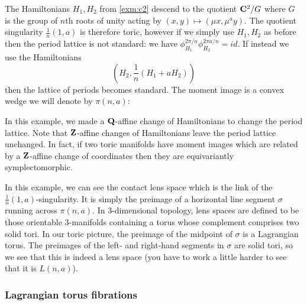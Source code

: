 \documentclass{article}
\begin{document}
\begin{Example}\label{exm:quotsing}
The Hamiltonians \(H_1,H_2\) from \cref{exm:c2} descend to the
quotient \(\mathbf{C}^2/G\) where \(G\) is the group of \(n\)th roots of
unity acting by \((x,y)\mapsto (\mu x,\mu^a y)\). The quotient
singularity \(\frac{1}{n}(1,a)\) is therefore toric, however if we
simply use \(H_1,H_2\) as before then the period lattice is not
standard: we have \(\phi_{H_1}^{2\pi/n}\phi_{H_2}^{2\pi
a/n}=id\). If instead we use the Hamiltonians
\[\left(H_2,\frac{1}{n}(H_1+aH_2)\right)\]
then the lattice of periods becomes standard. The moment image is
a convex wedge we will denote by \(\pi(n,a)\):


\begin{center}
\end{center}
\end{Example}
\begin{Remark}
In this example, we made a \(\mathbf{Q}\)-affine change of Hamiltonians to
change the period lattice. Note that \(\mathbf{Z}\)-affine changes of
Hamiltonians leave the period lattice unchanged. In fact, if two
toric manifolds have moment images which are related by a
\(\mathbf{Z}\)-affine change of coordinates then they are equivariantly
symplectomorphic.


\end{Remark}
\begin{Remark}
In this example, we can see the contact lens space which is the link
of the \(\frac{1}{n}(1,a)\)-singularity. It is simply the preimage
of a horizontal line segment \(\sigma\) running across
\(\pi(n,a)\). In 3-dimensional topology, lens spaces are defined to
be those orientable 3-manifolds containing a torus whose complement
comprises two solid tori. In our toric picture, the preimage of the
midpoint of \(\sigma\) is a Lagrangian torus. The preimages of the
left- and right-hand segments in \(\sigma\) are solid tori, so we
see that this is indeed a lens space (you have to work a little
harder to see that it is \(L(n,a)\)).


\end{Remark}
\subsubsection{Lagrangian torus fibrations}
\end{document}
